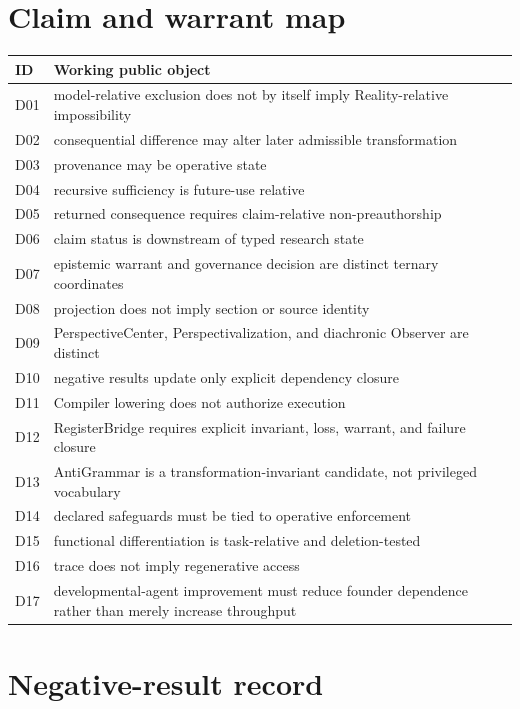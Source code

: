 \appendix
\section{Claim and warrant map}

\begin{center}
\begin{tabularx}{0.96\textwidth}{lX}
\toprule
ID & Working public object \\
\midrule
D01 & model-relative exclusion does not by itself imply Reality-relative impossibility \\
D02 & consequential difference may alter later admissible transformation \\
D03 & provenance may be operative state \\
D04 & recursive sufficiency is future-use relative \\
D05 & returned consequence requires claim-relative non-preauthorship \\
D06 & claim status is downstream of typed research state \\
D07 & epistemic warrant and governance decision are distinct ternary coordinates \\
D08 & projection does not imply section or source identity \\
D09 & PerspectiveCenter, Perspectivalization, and diachronic Observer are distinct \\
D10 & negative results update only explicit dependency closure \\
D11 & Compiler lowering does not authorize execution \\
D12 & RegisterBridge requires explicit invariant, loss, warrant, and failure closure \\
D13 & AntiGrammar is a transformation-invariant candidate, not privileged vocabulary \\
D14 & declared safeguards must be tied to operative enforcement \\
D15 & functional differentiation is task-relative and deletion-tested \\
D16 & trace does not imply regenerative access \\
D17 & developmental-agent improvement must reduce founder dependence rather than merely increase throughput \\
\bottomrule
\end{tabularx}
\end{center}

\section{Negative-result record}

